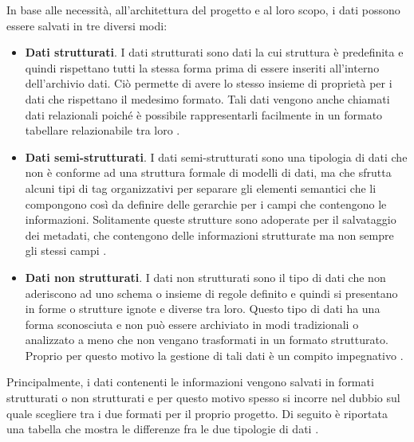 In base alle necessità, all'architettura del progetto e al loro scopo, i dati possono essere salvati in tre diversi modi:

\begin{itemize}
    \item \textbf{Dati strutturati}. I dati strutturati sono dati la cui struttura è predefinita e quindi rispettano tutti la stessa forma prima di essere inseriti all'interno dell'archivio dati. Ciò permette di avere lo stesso insieme di proprietà per i dati che rispettano il medesimo formato. Tali dati vengono anche chiamati dati relazionali poiché è possibile rappresentarli facilmente in un formato tabellare relazionabile tra loro \cite{geeksforgeeks_big_data_structure}.
    \item \textbf{Dati semi-strutturati}. I dati semi-strutturati sono una tipologia di dati che non è conforme ad una struttura formale di modelli di dati, ma che sfrutta alcuni tipi di tag organizzativi per separare gli elementi semantici che li compongono così da definire delle gerarchie per i campi che contengono le informazioni. Solitamente queste strutture sono adoperate per il salvataggio dei metadati, che contengono delle informazioni strutturate ma non sempre gli stessi campi \cite{magnimind_big_data_structure}.
    \item \textbf{Dati non strutturati}. I dati non strutturati sono il tipo di dati che non aderiscono ad uno schema o insieme di regole definito e quindi si presentano in forme o strutture ignote e diverse tra loro. Questo tipo di dati ha una forma sconosciuta e non può essere archiviato in modi tradizionali o analizzato a meno che non vengano trasformati in un formato strutturato. Proprio per questo motivo la gestione di tali dati è un compito impegnativo \cite{altervista_big_data_structure}.
\end{itemize}

Principalmente, i dati contenenti le informazioni vengono salvati in formati strutturati o non strutturati e per questo motivo spesso si incorre nel dubbio sul quale scegliere tra i due formati per il proprio progetto. Di seguito è riportata una tabella che mostra le differenze fra le due tipologie di dati \cite{analytixlabs_big_data_structure}.

